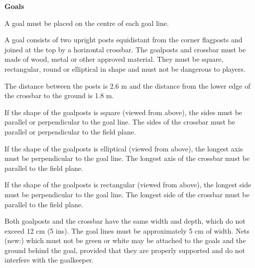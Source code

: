 \bigskip

{\bfseries Goals }

\headlinebox

A goal must be placed on the centre of each goal line.


\bigskip

A goal consists of two upright posts equidistant from the corner flagposts and joined at the top by a horizontal crossbar. The goalposts and crossbar must be made of wood, metal or other approved material. They must be square, rectangular, round or elliptical in shape and must
not be dangerous to players.

\bigskip

The distance between the posts is 2.6 m and the distance from the lower edge of the crossbar to the ground is 1.8 m. 


\bigskip


\bigskip


\bigskip

If the shape of the goalposts is square (viewed from above), the sides must be parallel or perpendicular to the goal line. The sides of the crossbar must be parallel or perpendicular to the field plane.

\bigskip

If the shape of the goalposts is elliptical (viewed from above), the longest axis must be perpendicular to the goal line. The longest axis of the crossbar must be parallel to the field plane.

\bigskip

If the shape of the goalposts is rectangular (viewed from above), the longest side must be perpendicular to the goal line. The longest side of the crossbar must be parallel to the field plane.

\bigskip

Both goalposts and the crossbar have the same width and depth, which do not exceed 12 cm (5 ins).
The goal lines must be approximately 5 cm of width. 
Nets (new:) which must not be green or white may be attached to the goals and the ground behind the goal, provided that they are properly supported and do not interfere with the goalkeeper. 

